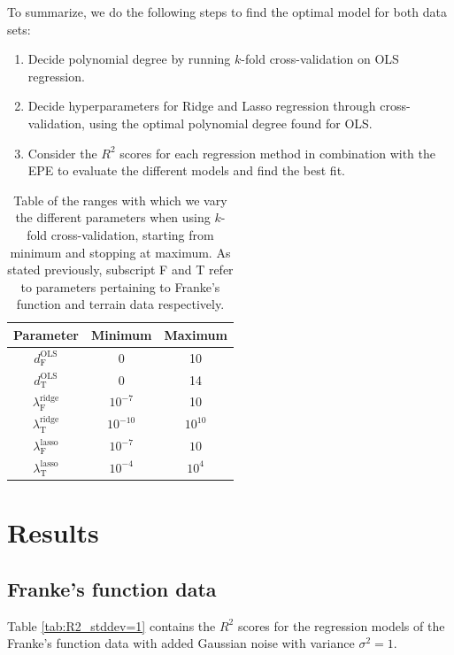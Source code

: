 \documentclass[a4paper, 10pt]{article}
\begin{document}
\begin{multicols}{2}
To summarize, we do the following steps to find the optimal model for both data sets:
\begin{enumerate}
\item Decide polynomial degree by running $k$-fold cross-validation on OLS regression.
\item Decide hyperparameters for Ridge and Lasso regression through cross-validation, using the optimal polynomial degree found for OLS.
\item Consider the $R^2$ scores for each regression method in combination with the EPE to evaluate the different models and find the best fit.
\end{enumerate}

\begin{table}[H]
\caption{Table of the ranges with which we vary the different parameters when using $k$-fold cross-validation, starting from minimum and stopping at maximum. As stated previously, subscript F and T refer  to parameters pertaining to Franke's function and terrain data respectively.}
\label{tab:parameters_kfold}
\centering
{\setlength{\extrarowheight}{4pt}
\begin{tabular}{| c | c | c |} \hline
Parameter & Minimum & Maximum  \\ \hline
$d_\text{F}^\text{OLS}$ & 0 & 10 \\ \hline
$d_\text{T}^\text{OLS}$ & 0 & 14 \\ \hline
$\lambda^\text{ridge}_\text{F}$  & $10^{-7}$ & 10\\ \hline
$\lambda^\text{ridge}_\text{T}$ & $10^{-10}$ & $10^{10}$\\ \hline
$\lambda^\text{lasso}_\text{F}$  & $10^{-7}$ & $10$\\ \hline
$\lambda^\text{lasso}_\text{T}$ & $10^{-4}$ & $10^{4}$\\ \hline
\end{tabular}}
\end{table}





\section{Results}
\subsection{Franke's function data}
Table \ref{tab:R2_stddev=1} contains the $R^2$ scores for the regression models of the Franke's function data with added Gaussian noise with variance $\sigma^2 = 1$.


\end{multicols}
\end{document}

